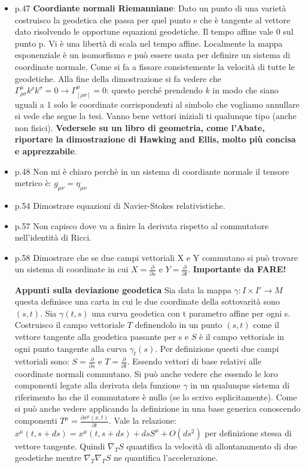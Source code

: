 \documentclass[10pt,a4paper]{article}
\begin{document}
\begin{itemize}
\item p.47 \textbf{Coordiante normali Riemanniane}:
Dato un punto di una varietà costruisco la geodetica che passa per quel punto e che è tangente al vettore dato risolvendo le opportune equazioni geodetiche. Il tempo affine vale 0 sul punto p. Vi è una libertà di scala nel tempo affine. Localmente   la mappa esponenziale è un isomorfismo e può essere usata per definire un sistema di coordinate normale. Come si fa a fissare consistemente la velocità di tutte le geodetiche.
Alla fine della dimostrazione si fa vedere che $\Gamma^{\mu}_{\rho \sigma} k^{\rho} k^{\sigma} = 0 \rightarrow \Gamma^{\mu}_{[\rho \sigma]} = 0$: questo perché prendendo $k$ in modo che siano uguali a 1 solo le coordinate corrispondenti al simbolo che vogliamo annullare si vede che segue la tesi. Vanno bene vettori iniziali ti qualunque tipo (anche non fisici).
\textbf{Vedersele su un libro di geometria, come l'Abate, riportare la dimostrazione di Hawking and Ellis, molto più concisa e apprezzabile}.

\item p.48 Non mi è chiaro perchè in un sistema di coordiante normale il tensore metrico è: $g_{\mu \nu} = \eta_{\mu \nu}$

\item p.54 Dimostrare equazioni di Navier-Stokes relativistiche.

\item p.57 Non capisco dove va a finire la derivata rispetto al  commutatore nell'identità di Ricci.

\item p.58 Dimostrare che se due campi vettoriali X e Y commutano si può trovare un sistema di coordinate in cui $X = \frac{\partial}{\partial s}$ e $Y = \frac{\partial}{\partial t}$. \textbf{Importante da FARE!}

\textbf{Appunti sulla deviazione geodetica}
Sia data la mappa $\gamma: I \times I' \rightarrow M$ questa definisce una carta in cui le due coordinate della sottovarità sono $(s, t)$. Sia $\gamma(t, s)$ una curva geodetica con t parametro affine per ogni s. Costruisco il campo vettoriale $T$ definendolo in un punto $(s, t)$ come il vettore tangente alla geodetica passante per s e $S$ è il campo vettoriale in ogni punto tangente alla curva $\gamma_{t}(s)$. Per definizione questi due campi vettoriali sono: $S = \frac{\partial}{\partial s}$ e $T = \frac{\partial}{\partial t}$. Essendo vettori di base relativi alle coordinate normali commutano. Si può anche vedere che essendo le loro componenti legate alla derivata dela funzione $\gamma$ in un qualunque sistema di riferimento ho che il commutatore è nullo (se lo scrivo esplicitamente). Come si può anche vedere applicando la definizione in una base generica conoscendo componenti $T^{\mu} = \frac{\partial x^{\mu}(x, t)}{\partial t}$. Vale la relazione: $x^{\mu} (t, s+ds) = x^{\mu} (t, s+ds) + ds S^{\mu} + O(ds^2)$ per definizione stessa di vettore tangente. Quindi $\nabla_{T} S$ quantifica la velocità di allontanamento di due geodetiche mentre $\nabla_{T}\nabla_{T} S$ ne quantifica l'accelerazione. 


\end{itemize}
\end{document}
